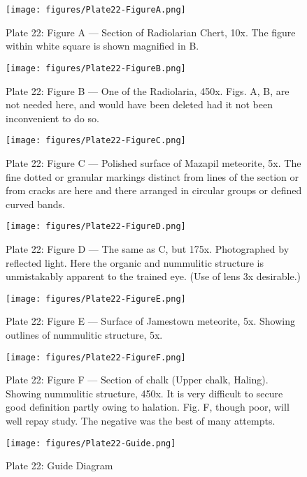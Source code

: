 \documentclass[a4paper, 12pt, oneside]{article}
\begin{document}
\clearpage
{}
\cfoot{\thepage}
\begin{figure}[b]
\centering
\texttt{[image: figures/Plate22-FigureA.png]}
\caption{\small Plate 22: Figure A --- Section of Radiolarian Chert, 10x. The figure within white square is shown magnified in B.}
\end{figure}
\clearpage
\begin{figure}[b]
\centering
\texttt{[image: figures/Plate22-FigureB.png]}
\caption{\small Plate 22: Figure B --- One of the Radiolaria, 450x. Figs. A, B, are not needed here, and would have been deleted had it not been inconvenient to do so.}
\end{figure}
\clearpage
\begin{figure}[b]
\centering
\texttt{[image: figures/Plate22-FigureC.png]}
\caption{\small Plate 22: Figure C --- Polished surface of Mazapil meteorite, 5x. The fine dotted or granular markings distinct from lines of the section or from cracks are here and there arranged in circular groups or defined curved bands.}
\end{figure}
\clearpage
\begin{figure}[b]
\centering
\texttt{[image: figures/Plate22-FigureD.png]}
\caption{\small Plate 22: Figure D --- The same as C, but 175x. Photographed by reflected light. Here the organic and nummulitic structure is unmistakably apparent to the trained eye. (Use of lens 3x desirable.)}
\end{figure}
\clearpage
\begin{figure}[b]
\centering
\texttt{[image: figures/Plate22-FigureE.png]}
\caption{\small Plate 22: Figure E --- Surface of Jamestown meteorite, 5x. Showing outlines of nummulitic structure, 5x.}
\end{figure}
\clearpage
\begin{figure}[b]
\centering
\texttt{[image: figures/Plate22-FigureF.png]}
\caption{\small Plate 22: Figure F --- Section of chalk (Upper chalk, Haling). Showing nummulitic structure, 450x. It is very difficult to secure good definition partly owing to halation. Fig. F, though poor, will well repay study. The negative was the best of many attempts.}
\end{figure}
\clearpage
\begin{figure}[b]
\centering
\texttt{[image: figures/Plate22-Guide.png]}
\caption{\small Plate 22: Guide Diagram}
\end{figure}
\end{document}
